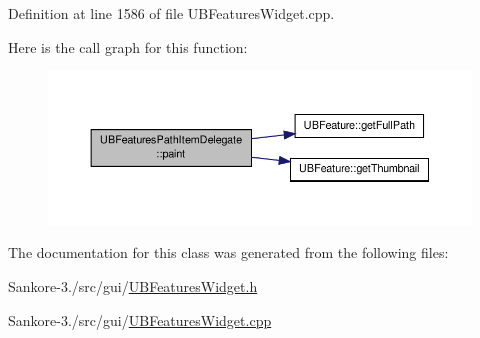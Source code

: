 Definition at line 1586 of file U\-B\-Features\-Widget.\-cpp.



Here is the call graph for this function\-:
\nopagebreak
\begin{figure}[H]
\begin{center}
\leavevmode
\includegraphics[width=350pt]{d0/dea/class_u_b_features_path_item_delegate_a89a4e70e902375f5c5f2032442bda8b3_cgraph}
\end{center}
\end{figure}




The documentation for this class was generated from the following files\-:\begin{DoxyCompactItemize}
\item 
Sankore-\/3./src/gui/\hyperlink{_u_b_features_widget_8h}{U\-B\-Features\-Widget.\-h}\item 
Sankore-\/3./src/gui/\hyperlink{_u_b_features_widget_8cpp}{U\-B\-Features\-Widget.\-cpp}\end{DoxyCompactItemize}
